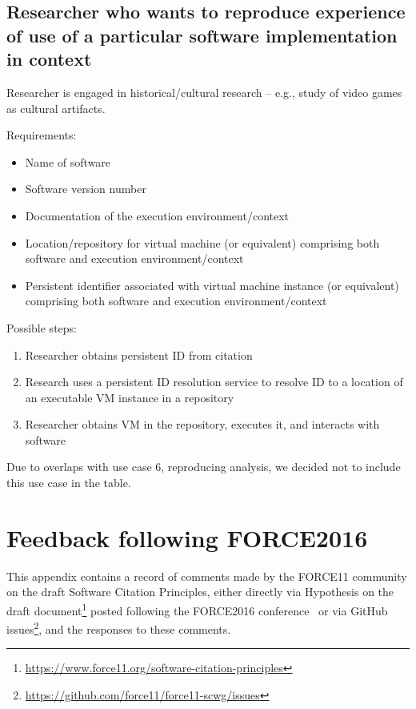 \documentclass[12pt, oneside]{amsart}
\begin{document}
\subsection*{Researcher who wants to reproduce experience of use of a particular software implementation in context}

Researcher is engaged in historical/cultural research -- e.g., study of video games as cultural artifacts.

Requirements:
\begin{itemize}
\item Name of software
\item Software version number
\item Documentation of the execution environment/context
\item Location/repository for virtual machine (or equivalent) comprising both software and execution environment/context
\item Persistent identifier associated with virtual machine instance (or equivalent) comprising both software and execution environment/context
\end{itemize}

Possible steps:
\begin{enumerate}
\item Researcher obtains persistent ID from citation
\item Research uses a persistent ID resolution service to resolve ID to a location of  an executable VM instance in a repository
\item Researcher obtains VM in the repository, executes it, and interacts with software
\end{enumerate}

Due to overlaps with use case 6, reproducing analysis, we decided not to include
this use case in the table.

\section{Feedback following FORCE2016}
\label{app:force16-feedback}

This appendix contains a record of comments made by the FORCE11 community on the draft Software Citation Principles, either directly via Hypothesis on the draft document\footnote{\url{https://www.force11.org/software-citation-principles}} posted following the FORCE2016 conference~\cite{force2016} or via GitHub issues\footnote{\url{https://github.com/force11/force11-scwg/issues}}, and the responses to these comments.
\end{document}
